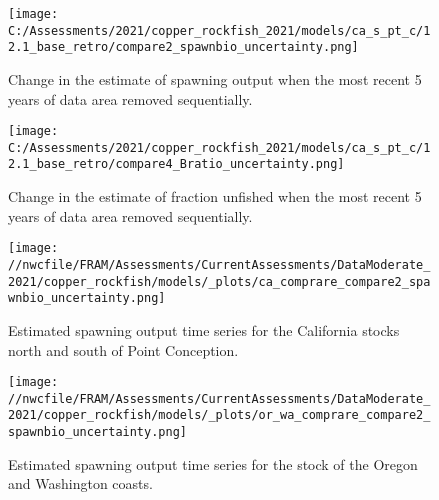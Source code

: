 \documentclass[11pt,
  english,
  a4paper,
]{article}
\begin{document}
\begin{figure}
\centering
\texttt{[image: C:/Assessments/2021/copper\_rockfish\_2021/models/ca\_s\_pt\_c/12.1\_base\_retro/compare2\_spawnbio\_uncertainty.png]}
\caption{Change in the estimate of spawning output when the most recent 5 years of data area removed sequentially.\label{fig:retro-ssb}}
\end{figure}

\tagmcend\tagstructend


\begin{figure}
\centering
\texttt{[image: C:/Assessments/2021/copper\_rockfish\_2021/models/ca\_s\_pt\_c/12.1\_base\_retro/compare4\_Bratio\_uncertainty.png]}
\caption{Change in the estimate of fraction unfished when the most recent 5 years of data area removed sequentially.\label{fig:retro-depl}}
\end{figure}

\tagmcend\tagstructend

\newpage


\begin{figure}
\centering
\texttt{[image: //nwcfile/FRAM/Assessments/CurrentAssessments/DataModerate\_2021/copper\_rockfish/models/\_plots/ca\_comprare\_compare2\_spawnbio\_uncertainty.png]}
\caption{Estimated spawning output time series for the California stocks north and south of Point Conception.\label{fig:ssb-ca-compare}}
\end{figure}

\tagmcend\tagstructend


\begin{figure}
\centering
\texttt{[image: //nwcfile/FRAM/Assessments/CurrentAssessments/DataModerate\_2021/copper\_rockfish/models/\_plots/or\_wa\_comprare\_compare2\_spawnbio\_uncertainty.png]}
\caption{Estimated spawning output time series for the stock of the Oregon and Washington coasts.\label{fig:ssb-orwa-compare}}
\end{figure}
\end{document}
